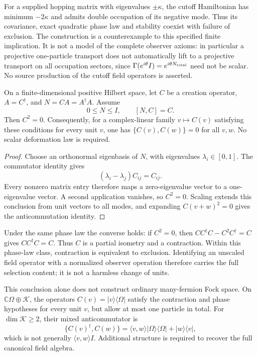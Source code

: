 For a supplied hopping matrix with eigenvalues $\pm\kappa$, the
cutoff Hamiltonian has minimum $-2\kappa$ and admits double occupation
of its negative mode. Thus its covariance, exact quadratic phase law
and stability coexist with failure of exclusion. The construction is a
counterexample to this specified finite implication. It is not a model
of the complete observer axioms: in particular a projective one-particle
transport does not automatically lift to a projective transport on all
occupation sectors, since
$\Gamma(e^{i\theta}I)=e^{i\theta N_{\rm total}}$ need not be scalar.
No source production of the cutoff field operators is asserted.

\begin{proposition}
\label{prop:contractive-creation-exclusion}
On a finite-dimensional positive Hilbert space, let $C$ be a creation
operator, $A=C^\dagger$, and $N=CA=A^\dagger A$. Assume
\[
 0\leq N\leq I,\qquad [N,C]=C.
\]
Then $C^2=0$. Consequently, for a complex-linear family $v\mapsto C(v)$
satisfying these conditions for every unit $v$, one has
$\{C(v),C(w)\}=0$ for all $v,w$. No scalar deformation law is required.
\end{proposition}
\begin{proof}
Choose an orthonormal eigenbasis of $N$, with eigenvalues
$\lambda_i\in[0,1]$. The commutator identity gives
\[
 (\lambda_i-\lambda_j)C_{ij}=C_{ij}.
\]
Every nonzero matrix entry therefore maps a zero-eigenvalue vector to
a one-eigenvalue vector. A second application vanishes, so $C^2=0$.
Scaling extends this conclusion from unit vectors to all modes, and
expanding $C(v+w)^2=0$ gives the anticommutation identity.
\end{proof}

Under the same phase law the converse holds: if $C^2=0$, then
$CC^\dagger C-C^2C^\dagger=C$ gives $CC^\dagger C=C$.
Thus $C$ is a partial isometry and a contraction. Within this phase-law
class, contraction is equivalent to exclusion. Identifying an unscaled
field operator with a normalized observer operation therefore carries
the full selection content; it is not a harmless change of units.

This conclusion alone does not construct ordinary many-fermion Fock
space. On $\mathbb C\Omega\oplus\mathcal K$, the operators
$C(v)=|v\rangle\langle\Omega|$ satisfy the contraction and phase
hypotheses for every unit $v$, but allow at most one particle in total.
For $\dim\mathcal K\geq2$, their mixed anticommutator is
\[
 \{C(v)^\dagger,C(w)\}
   =\langle v,w\rangle|\Omega\rangle\langle\Omega|
      +|w\rangle\langle v|,
\]
which is not generally $\langle v,w\rangle I$. Additional structure
is required to recover the full canonical field algebra.

